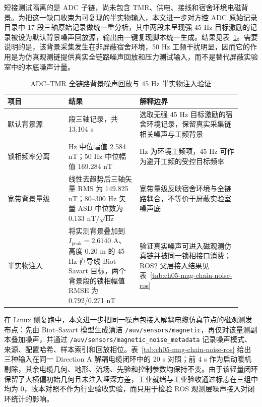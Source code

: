 短接测试隔离的是 ADC 子链，尚未包含 TMR、供电、接线和宿舍环境电磁背景。为把这一缺口收束为可复现的半实物输入，本文进一步对方控 ADC 原始记录目录中 17 段三轴原始记录做统一重分析，其中两段未呈现强 45 Hz 目标激励的记录被设为默认背景噪声回放源，输出由一键复现脚本统一生成。结果见表~\ref{tab:ch05-mag-chain-noise-replay}。需要说明的是，该背景采集发生在非屏蔽宿舍环境，50 Hz 工频干扰明显，因而它的作用是为仿真观测链提供真实全链路噪声回放和压力测试输入，而不是替代屏蔽实验室中的本底噪声计量。

\begin{table}[htbp]
\centering
\small
\setlength{\tabcolsep}{4pt}
\caption{ADC--TMR 全链路背景噪声回放与 45 Hz 半实物注入验证}\label{tab:ch05-mag-chain-noise-replay}
\begin{tabular}{@{}>{\raggedright\arraybackslash}p{0.24\linewidth}>{\raggedright\arraybackslash}p{0.28\linewidth}>{\raggedright\arraybackslash}p{0.40\linewidth}@{}}
\toprule
项目 & 结果 & 解释边界 \\
\midrule
默认背景源 & 2 段三轴记录，共 13.104 s & 选取无强 45 Hz 目标激励的宿舍环境记录，保留真实采集链相关噪声与工频背景 \\
锁相频率分离 & 45 Hz 中位幅值 2.584 nT；50 Hz 中位幅值 169.284 nT & 50 Hz 为环境工频项，45 Hz 可作为避开工频的受控目标频率 \\
宽带背景量级 & 线性去趋势后三轴矢量 RMS 为 149.825 nT；80--300 Hz 矢量 ASD 中位数为 0.133 nT/\(\sqrt{\text{Hz}}\) & 宽带量级反映宿舍环境与全链路耦合，不等价于屏蔽实验室噪声底 \\
半实物注入 & 将实测背景叠加到 \(I_{\mathrm{peak}}=2.6140\text{ A}\)、高度 0.20 m 的 45 Hz 直导线 Biot--Savart 目标，两个背景段的锁相幅值 RMSE 为 0.792/0.271 nT & 验证真实噪声可进入磁观测仿真链并被同一锁相接口消费；ROS2 父层接入结果见表~\ref{tab:ch05-mag-chain-noise-ros} \\
\bottomrule
\end{tabular}
\end{table}
\FloatBarrier

在 Linux 侧复跑中，本文进一步把同一噪声包接入解耦电缆仿真节点的磁观测发布点：先由 Biot--Savart 模型生成清洁 \texttt{/auv/sensors/magnetic}，再仅对该量测副本叠加噪声，并通过 \texttt{/auv/sensors/magnetic\_noise\_metadata} 记录噪声模式、来源、配置哈希、样本索引和回放相位。表~\ref{tab:ch05-mag-chain-noise-ros} 给出三种输入在同一 Direction A 解耦电缆闭环中的 20 s 对照；前 4 s 作为启动暖机剔除，其余电缆几何、地形、流场、先验和控制参数均保持不变。由于该轻量闭环保留了大横偏初始几何且未注入埋深方差，工业就绪与工业验收通过标志在三组中均为 0，故本对照不作为行业验收实验，而只用于检验 ROS 观测层噪声接入对闭环统计的影响。

